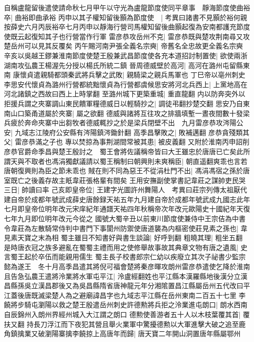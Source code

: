 自稱盧龍留後遣使請命秋七月甲午以守光為盧龍節度使同平章事　靜海節度使曲裕卒|{
	曲裕即曲承裕}
丙申以其子權知留後顥為節度使　|{
	考異曰諸書不見顥於裕何親按薛史六月丙辰裕卒七月丙申以靜海行營司馬權知留後曲顥起復為安南都護充節度使既云起復知其子也行營當作行軍}
雷彦恭攻岳州不克|{
	雷彦恭既與楚攻荆南尋又攻楚岳州可以見其反覆矣}
丙午賜河南尹張全義名宗奭|{
	帝舊名全忠故更全義名宗奭}
辛亥以吳越王鏐兼淮南節度使楚王殷兼武昌節度使各充本道招討制置使|{
	欲使兩浙湖南攻弘農王楊渥先分授以楊氏所統二鎮}
晉周德威壁於高河|{
	高河在潞州屯留縣東南}
康懷貞遣親騎都頭秦武將兵擊之武敗|{
	親騎梁之親兵馬軍也}
丁巳帝以亳州刺史李思安代懷貞為潞州行營都統黜懷貞為行營都虞候思安將河北兵西上|{
	上黨地高在河北諸鎮之西故曰西上上時掌翻}
至潞州城下更築重城|{
	重直龍翻}
内以防奔突外以拒援兵謂之夾寨調山東民饋軍糧德威日以輕騎抄之|{
	調徒弔翻抄楚交翻}
思安乃自東南山口築甬道屬於夾寨|{
	屬之欲翻}
德威與諸將互往攻之排牆填塹一晝夜間數十發梁兵疲於奔命夾寨中出芻牧者德威輒抄之於是梁兵閉壁不出　九月雷彦恭攻涔陽公安|{
	九域志江陵府公安縣有涔陽鎮涔鋤針翻}
高季昌擊敗之|{
	敗補邁翻}
彦恭貪殘類其父|{
	雷彦恭滿之子也}
專以焚掠為事荆湖間常被其患|{
	被皮義翻}
又附於淮南丙申詔削彦恭官爵命季昌與楚王殷討之　蜀王會將佐議稱帝皆曰大王雖忠於唐唐已亡矣此所謂天與不取者也馮涓獨獻議請以蜀王稱制曰朝興則未爽稱臣|{
	朝直遥翻爽乖也言若唐朝復興則為臣之節未乖也}
賊在則不同為惡王不從涓杜門不出|{
	馮涓馮宿之孫於唐室既亡之後義存故主眂韋莊張格輩有間矣}
王用安撫副使掌書記韋莊之謀帥吏民哭三日|{
	帥讀曰率}
己亥即皇帝位|{
	王建字光圖許州舞陽人　考異曰莊宗列傳太祖厭代建自帝於成都年號武成薛史唐餘録天祐五年九月建自帝於成都年號武成九國志此年七月即皇帝位明年改元宋庠紀年通譜天祐四年秋稱帝次年改元歐陽史十國紀年天復七年九月即位明年改元今從之}
國號大蜀辛丑以前東川節度使兼侍中王宗佶為中書令韋莊為左散騎常侍判中書門下事閬州防禦使唐道襲為内樞密使莊見素之孫也|{
	韋見素天寶之末為相}
蜀主雖目不知書好與書生談論|{
	好呼到翻}
粗曉其理|{
	粗坐五翻}
是時唐衣冠之族多避亂在蜀蜀主禮而用之使修舉故事故其典章文物有唐之遺風|{
	史言蜀王起於卒伍而能親用儒生}
蜀主長子校書郎宗仁幼以疾廢立其次子祕書少監宗懿為遂王　冬十月高季昌遣其將倪可福會楚將秦彦暉攻朗州雷彦恭遣使乞降於淮南且告急弘農王遣將泠業將水軍屯平江|{
	泠盧經翻姓也平江縣本漢羅縣地後漢分立漢昌縣孫吳立漢昌郡後又為吳昌縣隋省唐神龍元年分湘隂置昌江縣屬岳州五代改曰平江蓋後唐既滅梁楚人為之避廟諱昌字也九域志平江縣在岳州東南二百五十七里}
李饒將步騎屯瀏陽以救之楚王殷遣岳州刺史許德勲將兵拒之泠業進屯朗口|{
	朗水西南自辰錦州入朗州界經州城入大江謂之朗口}
德勲使善游者五十人以木枝葉覆其首|{
	覆扶又翻}
持長刀浮江而下夜犯其營且舉火業軍中驚擾德勲以大軍進擊大破之追至鹿角鎮擒業又破瀏陽寨擒李饒掠上高唐年而歸|{
	唐天寶二年開山洞置唐年縣屬鄂州}
